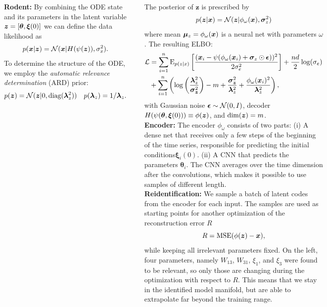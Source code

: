 \documentclass[25pt]{tikzposter}
\begin{document}
\begin{columns}
{    \textbf{Rodent:} By combining the ODE state and its parameters in the
    latent variable $\bm{z}=[\bm\theta,\bm\xi(0)]$ we can define the data
    likelihood as
    \begin{align}
      \label{eq:decoder}
      p(\bm{x}|\bm{z}) &= \mathcal{N}(\bm{x}|H(\psi(\bm{z})),\sigma_x^2).
    \end{align} 
    To determine the structure of the ODE, we employ the
    \emph{automatic relevance determination} (ARD) prior:
    \begin{align}
      \label{eq:ard_model}
      p(\z) &= \N(\z|0,\text{diag}(\laz^2)) &
      p(\laz) &= 1/\laz.%
    \end{align}

    The posterior of $\bm z$ is prescribed by
    \begin{align}
      \label{eq:ard_posterior}
      p(\bm{z}|\bm{x}) = \mathcal{N}(\bm{z}|\phi_\omega(\bm{x}), \bm{\sigma}_z^2)
    \end{align}
    where mean $\bm{\mu}_{z}=\phi_\omega(\bm{x})$ is a neural net with parameters
    $\omega$.
    The resulting ELBO:
    {\fontsize{25}{20}
    \begin{equation}
    \begin{aligned}
      \label{eq:elbo_reparam}
      \mathcal{L} &= \sum_{i=1}^n \text{E}_{p(z|x)}\left[\frac{(\bm{x}_i - \psi(\phi_\omega(\bm{x}_i) + \bm{\sigma}_z \odot \bm{\epsilon}))^2}{2\sigma_e^2}\right]
                  + \frac{nd}{2}\log(\sigma_e) \\
                  &+ \sum_{i=1}^n \left(
                      \log\left(\frac{\bm{\lambda}_z^2}{\bm{\sigma_z}^2}\right)
                      -m + \frac{\bm{\sigma_z}^2}{\bm{\lambda}_z^2} + \frac{\phi_\omega(\bm{x}_i)^2}{\bm{\lambda}_z^2}
                  \right),
    \end{aligned}
    \end{equation}}
    with Gaussian noise $\bm{\epsilon} \sim \mathcal{N}(0,I)$, decoder
    $H(\psi(\bm\theta,\bm\xi(0)))\equiv\phi(\bm{z})$, and $\text{dim}(\bm{z}) = m$.\\

    \textbf{Encoder:} The encoder $\phi_\omega$ consists of two parts: (i) A
    dense net that receives only a few steps of the beginning of the time
    series, responsible for predicting the initial conditions$\bm \xi_i(0)$.
    (ii) A CNN that predicts the parameters $\bm \theta_i$.  The CNN averages
    over the time dimension after the convolutions, which makes it possible to
    use samples of different length.\\

    \textbf{Reidentification:} We sample a batch of
    latent codes from the encoder for each input.  The samples
    are used as starting points for another optimization of the reconstruction
    error $R$
    \begin{equation}
      R = \mathrm{MSE}(\phi(\bm z) - \bm{x}),
    \end{equation}
    while keeping all irrelevant parameters fixed.
    On the left, four parameters, namely $W_{13}$,
    $W_{31}$, $\xi_{1}$, and $\xi_{3}$ were found to be relevant, so only
    those are changing during the optimization with respect to $R$.
    This means that we stay in the identified model manifold, but are able to
    extrapolate far beyond the training range.   

    \vspace{2.6cm}
  }
  
\end{columns}
\end{document}
